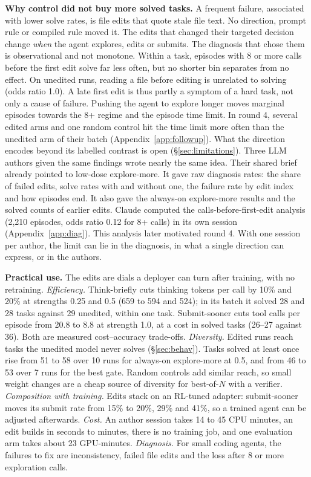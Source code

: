 \textbf{Why control did not buy more solved tasks.} A frequent failure, associated with lower solve rates, is file edits that quote stale file text. No direction, prompt rule or compiled rule moved it. The edits that changed their targeted decision change \emph{when} the agent explores, edits or submits. The diagnosis that chose them is observational and not monotone. Within a task, episodes with 8 or more calls before the first edit solve far less often, but no shorter bin separates from no effect. On unedited runs, reading a file before editing is unrelated to solving (odds ratio 1.0). A late first edit is thus partly a symptom of a hard task, not only a cause of failure. Pushing the agent to explore longer moves marginal episodes towards the 8+ regime and the episode time limit. In round 4, several edited arms and one random control hit the time limit more often than the unedited arm of their batch (Appendix~\ref{app:followup}). What the direction encodes beyond its labelled contrast is open (\S\ref{sec:limitations}). Three LLM authors given the same findings wrote nearly the same idea. Their shared brief already pointed to low-dose explore-more. It gave raw diagnosis rates: the share of failed edits, solve rates with and without one, the failure rate by edit index and how episodes end. It also gave the always-on explore-more results and the solved counts of earlier edits. Claude computed the calls-before-first-edit analysis (2,210 episodes, odds ratio 0.12 for 8+ calls) in its own session (Appendix~\ref{app:diag}). This analysis later motivated round 4. With one session per author, the limit can lie in the diagnosis, in what a single direction can express, or in the authors.

\textbf{Practical use.} The edits are dials a deployer can turn after training, with no retraining. \emph{Efficiency.} Think-briefly cuts thinking tokens per call by 10\% and 20\% at strengths 0.25 and 0.5 (659 to 594 and 524); in its batch it solved 28 and 28 tasks against 29 unedited, within one task. Submit-sooner cuts tool calls per episode from 20.8 to 8.8 at strength 1.0, at a cost in solved tasks (26--27 against 36). Both are measured cost--accuracy trade-offs. \emph{Diversity.} Edited runs reach tasks the unedited model never solves (\S\ref{sec:behav}). Tasks solved at least once rise from 51 to 58 over 10 runs for always-on explore-more at 0.5, and from 46 to 53 over 7 runs for the best gate. Random controls add similar reach, so small weight changes are a cheap source of diversity for best-of-$N$ with a verifier. \emph{Composition with training.} Edits stack on an RL-tuned adapter: submit-sooner moves its submit rate from 15\% to 20\%, 29\% and 41\%, so a trained agent can be adjusted afterwards. \emph{Cost.} An author session takes 14 to 45 CPU minutes, an edit builds in seconds to minutes, there is no training job, and one evaluation arm takes about 23 GPU-minutes. \emph{Diagnosis.} For small coding agents, the failures to fix are inconsistency, failed file edits and the loss after 8 or more exploration calls.

